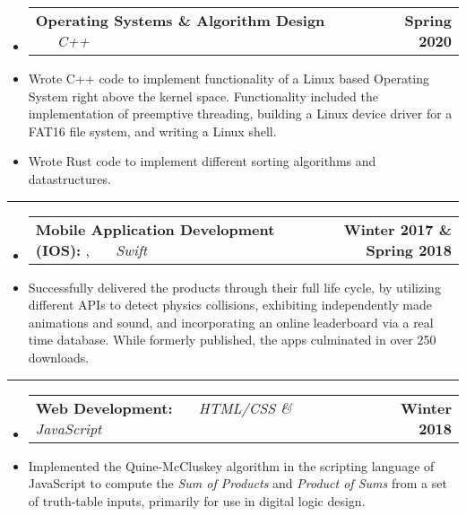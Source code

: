 \documentclass[10pt,letterpaper]{article}
\makeatletter
\newcommand{\header}[2]
{
	\begin{tabular*}{\linewidth}{l @{\extracolsep{\fill}} r}
		\hspace{-27pt} #1 & #2 \\
	\end{tabular*}
}
\makeatother
\begin{document}
\begin{itemize}
	\item[]
		\header
		{
			\textbf{Operating Systems \& Algorithm Design}
			\emph{\smash{Relevant Course Projects}} \ \ \ \footnotesize \emph{C++}
		}
		{\textbf{Spring 2020}}
	\item 
		Wrote C++ code to implement functionality of a Linux based Operating System right above the kernel space. Functionality included the implementation of preemptive threading, building a Linux device driver for a FAT16 file system, and writing a Linux shell.
	\item 
		Wrote Rust code to implement different sorting algorithms and datastructures.

\end{itemize}
\hrule
\begin{itemize}
	\item[]
		\header
		{
			\textbf{Mobile Application Development (IOS): }
			\href{https://appadvice.com/app/round-bound/1369632746}{\emph{\underline{\smash{Round 'a Bound}}}}, 
			\href{https://appadvice.com/app/tic-tac-emoji/1346934986}{\emph{\underline{\smash{Tic-Tac Emoji}}}} \ \ \ \footnotesize  \emph{Swift}
		}
		{\textbf{Winter 2017 \& Spring 2018}}
	\item 
		Successfully delivered the products through their full life cycle, by utilizing different APIs to detect physics collisions, exhibiting independently made animations and sound, and incorporating an online leaderboard via a real time database. While formerly published, the apps culminated in over 250 downloads.
\end{itemize}

\hrule

\begin{itemize}
	\item[]
		\header
		{	
			\textbf{Web Development: }
			\href{https://aashpointo.github.io/KmapWebsite/}{\emph{\underline{\smash{aashpointo.github.io/KmapWebsite}}}} \ \ \ \footnotesize \emph{HTML/CSS \& JavaScript}
		}
		{\textbf{Winter 2018}}
	\item
		Implemented the Quine-McCluskey algorithm in the scripting language of JavaScript to compute the \emph{Sum of Products} and \emph{Product of Sums} from a set of truth-table inputs, primarily for use in digital logic design.

\end{itemize}

																																																																																																																																																																																																																																										
\end{document}
